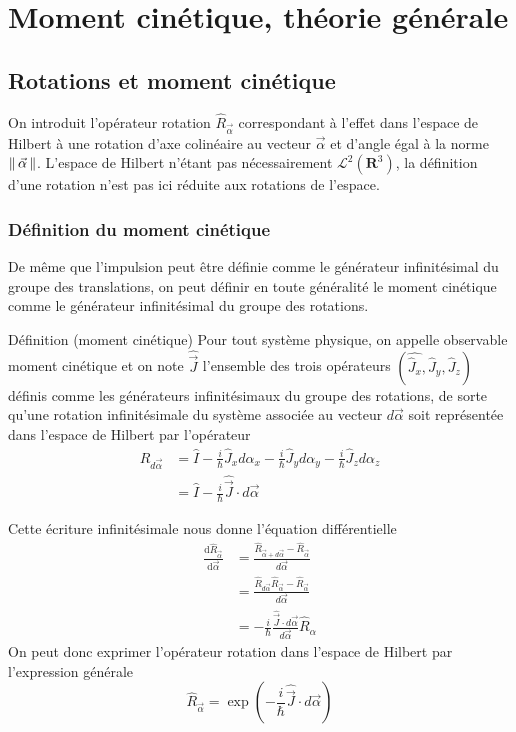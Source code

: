 \section{Moment cinétique, théorie générale}

    \subsection{Rotations et moment cinétique}

    On introduit l’opérateur rotation $\hat{R}_{\vec{\alpha}}$ correspondant à l’effet dans l’espace de Hilbert à une rotation d’axe colinéaire au vecteur $\vec{\alpha}$ et d’angle égal à la norme $\left\lVert \, \vec{\alpha} \, \right\rVert$. L’espace de Hilbert n’étant pas nécessairement $\mathcal{L}^2(\mathbf{R}^3)$, la définition d’une rotation n’est pas ici réduite aux rotations de l’espace.

        \subsubsection{Définition du moment cinétique}

        De même que l’impulsion peut être définie comme le générateur infinitésimal du groupe des translations, on peut définir en toute généralité le moment cinétique comme le générateur infinitésimal du groupe des rotations.

\begin{omed}{Définition (moment cinétique)}
    Pour tout système physique, on appelle observable moment cinétique et on note $\hat{\vec{J}}$ l’ensemble des trois opérateurs $(\hat{\hat{J}_x}, \hat{J}_y, \hat{J}_z)$ définis comme les générateurs infinitésimaux du groupe des rotations, de sorte qu’une rotation infinitésimale du système associée au vecteur $d\vec{\alpha}$ soit représentée dans l’espace de Hilbert par l’opérateur
    \begin{align*}
        \hat{R}_{d\vec{\alpha}}
         & = \hat{I} - \frac{i}{\hbar} \hat{J}_x d\alpha_x - \frac{i}{\hbar} \hat{J}_y d\alpha_y - \frac{i}{\hbar} \hat{J}_z d\alpha_z \\
         & = \hat{I} -  \frac{i}{\hbar} \hat{\vec{J}} \cdot d\vec{\alpha}
    \end{align*}
\end{omed}

Cette écriture infinitésimale nous donne l’équation différentielle
\begin{align*}
    \frac{\text{d}\hat{R}_{\vec{\alpha}}}{\text{d}\vec{\alpha}}
     & = \frac{\hat{R}_{\vec{\alpha} + d\vec{\alpha}} - \hat{R}_{\vec{\alpha}}}{d \vec{\alpha}}        \\
     & = \frac{\hat{R}_{d\vec{\alpha}}\hat{R}_{\vec{\alpha}} - \hat{R}_{\vec{\alpha}}}{d \vec{\alpha}} \\
     & = -\frac{i}{\hbar} \frac{\hat{\vec{J}} \cdot d\vec{\alpha}}{d\vec{\alpha}} \hat{R}_{\alpha}
\end{align*}
        On peut donc exprimer l’opérateur rotation dans l’espace de Hilbert par l’expression générale
        \[ \hat{R}_{\vec{\alpha}} = \exp\left(- \frac{i}{\hbar} \hat{\vec{J}} \cdot d\vec{\alpha} \right) \]

